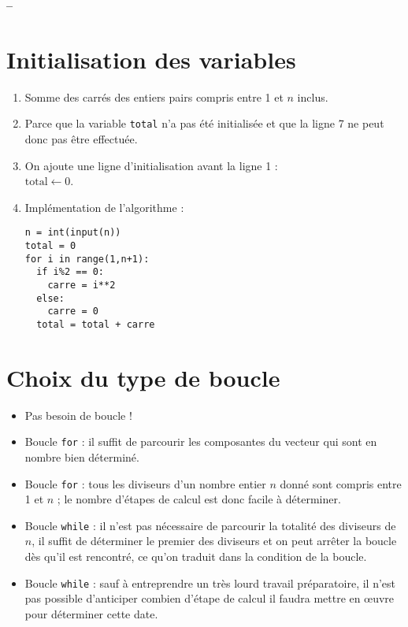 

%



\begin{center}
{\Large\bf {\type} \no {\num} -- \descrip}
\end{center}
 

\section{Initialisation des variables}

\begin{enumerate}
 \item Somme des carrés des entiers pairs compris entre 1 et $n$ inclus.
 
 \item Parce que la variable \texttt{total} n'a pas été initialisée et que la ligne 7 ne peut donc pas être effectuée.
 
 \item On ajoute une ligne d'initialisation avant la ligne 1 :\\
 $\text{total} \leftarrow 0$.
 
 \item Implémentation de l'algorithme :
 
\begin{verbatim}
n = int(input(n))
total = 0
for i in range(1,n+1):
  if i%2 == 0:
    carre = i**2
  else:
    carre = 0
  total = total + carre
\end{verbatim}
 
\end{enumerate}

\section{Choix du type de boucle}

\begin{itemize}
 \item Pas besoin de boucle !
 \item Boucle \texttt{for} : il suffit de parcourir les composantes du vecteur qui sont en nombre bien déterminé.
 \item Boucle \texttt{for} : tous les diviseurs d'un nombre entier $n$ donné sont compris entre 1 et $n$ ; le nombre d'étapes de calcul est donc facile à déterminer.
 \item Boucle \texttt{while} : il n'est pas nécessaire de parcourir la totalité des diviseurs de $n$, il suffit de déterminer le premier des diviseurs et on peut arrêter la boucle dès qu'il est rencontré, ce qu'on traduit dans la condition de la boucle. 
 \item Boucle \texttt{while} : sauf à entreprendre un très lourd travail préparatoire, il n'est pas possible d'anticiper combien d'étape de calcul il faudra mettre en œuvre pour déterminer cette date.
\end{itemize}

